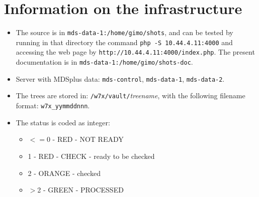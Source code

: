 \documentclass[12pt]{article}
\begin{document}
\section{Information on the infrastructure}

\begin{itemize}

\item The source is in \texttt{mds-data-1:/home/gimo/shots}, and can be tested
  by running in that directory the command \texttt{php -S 10.44.4.11:4000} and
accessing the web page by \texttt{http://10.44.4.11:4000/index.php}.
The present documentation is in \texttt{mds-data-1:/home/gimo/shots-doc}.


\item Server with MDSplus data:
 \texttt{mds-control},
 \texttt{mds-data-1},
 \texttt{mds-data-2}.

\item The trees are stored in:
\texttt{/w7x/vault/}\textit{treename}, with the following filename format:
\texttt{w7x\_yymmddnnn}.

\item The status is coded as integer:
\begin{itemize}
\item $<=$0 - RED - NOT READY
\item 1  -    RED - CHECK - ready to be checked
\item 2  -    ORANGE    - checked
\item $>$2 -  GREEN - PROCESSED
\end{itemize}
\end{itemize}
\end{document}

